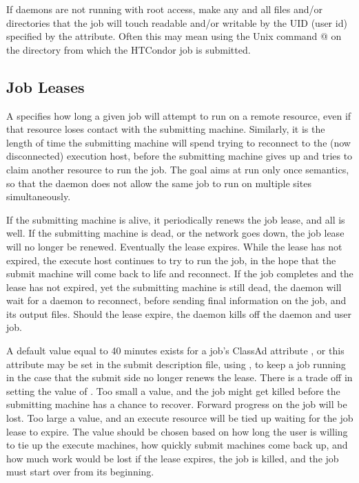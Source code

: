 If daemons are not running with root access, 
make any and all files
and/or directories that the job will touch readable and/or writable by
the UID (user id) specified by the  attribute.
Often this may
mean using the Unix command @
on the directory from which the HTCondor job is submitted.

\subsection{\label{sec:Job-Lease}
Job Leases}

A  specifies how long a given job will attempt to run
on a remote resource,
even if that resource loses contact with the submitting machine.
Similarly, it is the length of time the submitting machine will
spend trying to reconnect to the (now disconnected) execution host,
before the submitting machine gives up and tries to claim
another resource to run the job.
The goal aims at run only once semantics,
so that the  daemon does not allow the same job
to run on multiple sites simultaneously.

If the submitting machine is alive,
it periodically renews the job lease,
and all is well.
If the submitting machine is dead,
or the network goes down, the job lease will no longer be renewed.
Eventually the lease expires.
While the lease has not expired,
the execute host continues to try to run the job,
in the hope that the submit machine will come back to life
and reconnect.
If the job completes and the lease has not expired, yet the 
submitting machine is still dead,
the  daemon will wait for a
 daemon to reconnect, 
before sending final information on the job,
and its output files.
Should the lease expire, the  daemon
kills off the  daemon and user job.

A default value equal to 40 minutes exists for a job's
ClassAd attribute , 
or this attribute may be set in the submit description file,
using ,
to keep a job running in the case that the submit side no longer
renews the lease.
There is a trade off in setting the value of . 
Too small a value,
and the job might get killed before the submitting machine has a
chance to recover.
Forward progress on the job will be lost.
Too large a value,
and an execute resource will be tied up waiting for the job lease to expire.
The value should be chosen based on how long the user is willing to tie up
the execute machines, how quickly submit machines come  back up,
and how much work would be lost if the lease expires,
the job is killed, and the job must start over from its beginning.

